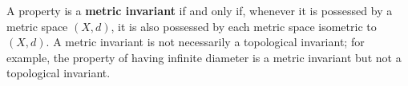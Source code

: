 A property is a \textbf{metric invariant} if and only if, whenever it is possessed by a metric space $(X,d)$, it is also possessed by each metric space isometric to $(X,d)$. A metric invariant is not necessarily a topological invariant; for example, the property of having infinite diameter is a metric invariant but not a topological invariant.

